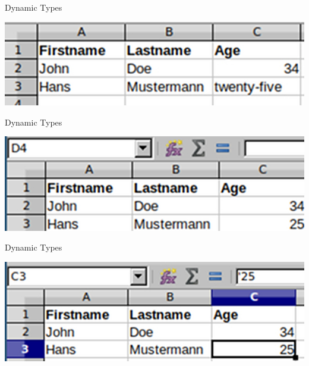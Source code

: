 \documentclass[aspectratio=169]{beamer}
\begin{document}
	\begin{frame}[fragile]{Dynamic Types}
		\begin{center}
		\includegraphics[width=1.0\textwidth]{exceldynamic.jpg}
		\end{center}
	\end{frame}

	\begin{frame}[fragile]{Dynamic Types}
		\begin{center}
		\includegraphics[width=1.0\textwidth]{exceldynamic2.jpg}
		\end{center}
	\end{frame}

	\begin{frame}[fragile]{Dynamic Types}
		\begin{center}
		\includegraphics[width=1.0\textwidth]{exceldynamic3.jpg}
		\end{center}
	\end{frame}
\end{document}
